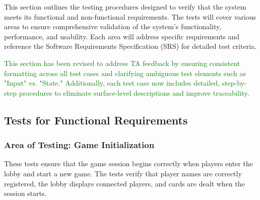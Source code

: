 \documentclass[12pt]{article}
\newcommand{\added}[1]{\textcolor{green}{#1}}
\begin{document}
This section outlines the testing procedures designed to verify that the system meets its functional and non-functional requirements. The tests will cover various areas to ensure comprehensive validation of the system’s functionality, performance, and usability. Each area will address specific requirements and reference the Software Requirements Specification (SRS) for detailed test criteria. 

\added{This section has been revised to address TA feedback by ensuring consistent formatting across all test cases and clarifying ambiguous test elements such as "Input" vs. "State." Additionally, each test case now includes detailed, step-by-step procedures to eliminate surface-level descriptions and improve traceability.}

\subsection{Tests for Functional Requirements}

\subsubsection{Area of Testing: Game Initialization}

These tests ensure that the game session begins correctly when players enter the lobby and start a new game. The tests verify that player names are correctly registered, the lobby displays connected players, and cards are dealt when the session starts.
\end{document}
